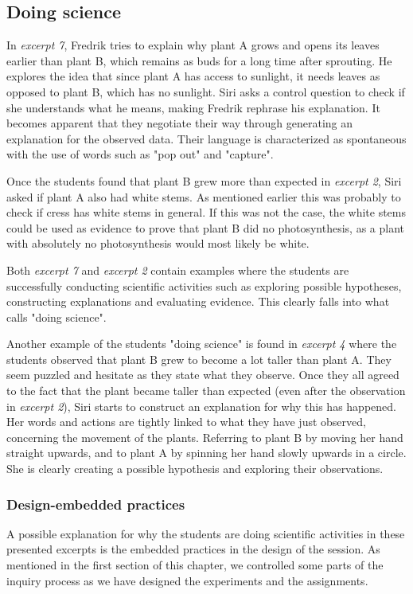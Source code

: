 \subsection{Doing science}
In \emph{excerpt 7}, Fredrik tries to explain why plant A grows and opens its leaves earlier than plant B, which remains as buds for a long time after sprouting. He explores the idea that since plant A has access to sunlight, it needs leaves as opposed to plant B, which has no sunlight. Siri asks a control question to check if she understands what he means, making Fredrik rephrase his explanation. It becomes apparent that they negotiate their way through generating an explanation for the observed data. Their language is characterized as spontaneous \citep{vygotsky2012thought} with the use of words such as "pop out" and "capture". 

Once the students found that plant B grew more than expected in \emph{excerpt 2}, Siri asked if plant A also had white stems. As mentioned earlier this was probably to check if cress has white stems in general. If this was not the case, the white stems could be used as evidence to prove that plant B did no photosynthesis, as a plant with absolutely no photosynthesis would most likely be white. 

Both \emph{excerpt 7} and \emph{excerpt 2} contain examples where the students are successfully conducting scientific activities such as exploring possible hypotheses, constructing explanations and evaluating evidence. This clearly falls into what \citet{jimenez2000doing} calls "doing science".

Another example of the students "doing science" is found in \emph{excerpt 4} where the students observed that plant B grew to become a lot taller than plant A. They seem puzzled and hesitate as they state what they observe. Once they all agreed to the fact that the plant became taller than expected (even after the observation in \emph{excerpt 2}), Siri starts to construct an explanation for why this has happened. Her words and actions are tightly linked to what they have just observed, concerning the movement of the plants. Referring to plant B by moving her hand straight upwards, and to plant A by spinning her hand slowly upwards in a circle. She is clearly creating a possible hypothesis and exploring their observations. 

\subsubsection{Design-embedded practices}
A possible explanation for why the students are doing scientific activities in these presented excerpts is the embedded practices in the design of the session. As mentioned in the first section of this chapter, we controlled some parts of the inquiry process as we have designed the experiments and the assignments. 

